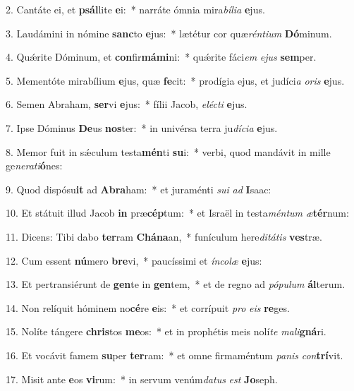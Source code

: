 2. Cantáte ei, et \textbf{psál}lite \textbf{e}i:~*  narráte ómnia mira\textit{bí}\textit{li}\textit{a} \textbf{e}jus.\

3. Laudámini in nómine \textbf{sanc}to \textbf{e}jus:~*  lætétur cor quæ\textit{rén}\textit{ti}\textit{um} \textbf{Dó}minum.\

4. Quǽrite Dóminum, et \textbf{con}fir\textbf{má}\textbf{mi}ni:~*  quǽrite fáci\textit{em} \textit{e}\textit{jus} \textbf{sem}per.\

5. Mementóte mirabílium \textbf{e}jus, quæ \textbf{fe}cit:~*  prodígia ejus, et judíci\textit{a} \textit{o}\textit{ris} \textbf{e}jus.\

6. Semen Abraham, \textbf{ser}vi \textbf{e}jus:~*  fílii Jacob, \textit{e}\textit{léc}\textit{ti} \textbf{e}jus.\

7. Ipse Dóminus \textbf{De}us \textbf{nos}ter:~*  in univérsa terra ju\textit{dí}\textit{ci}\textit{a} \textbf{e}jus.\

8. Memor fuit in sǽculum testa\textbf{mén}ti \textbf{su}i:~*  verbi, quod mandávit in mille ge\textit{ne}\textit{ra}\textit{ti}\textbf{ó}nes:\

9. Quod dispósu\textbf{it} ad \textbf{A}\textbf{bra}ham:~*  et juraménti \textit{su}\textit{i} \textit{ad} \textbf{I}saac:\

10. Et státuit illud Jacob \textbf{in} præ\textbf{cép}tum:~*  et Israël in testa\textit{mén}\textit{tum} \textit{æ}\textbf{tér}num:\

11. Dicens: Tibi dabo \textbf{ter}ram \textbf{Chá}\textbf{na}an,~*  funículum here\textit{di}\textit{tá}\textit{tis} \textbf{ves}træ.\

12. Cum essent \textbf{nú}mero \textbf{bre}vi,~*  paucíssimi et \textit{ín}\textit{co}\textit{læ} \textbf{e}jus:\

13. Et pertransiérunt de \textbf{gen}te in \textbf{gen}tem,~*  et de regno ad \textit{pó}\textit{pu}\textit{lum} \textbf{ál}terum.\

14. Non relíquit hóminem no\textbf{cé}re \textbf{e}is:~*  et corrípuit \textit{pro} \textit{e}\textit{is} \textbf{re}ges.\

15. Nolíte tángere \textbf{chris}tos \textbf{me}os:~*  et in prophétis meis nolí\textit{te} \textit{ma}\textit{li}\textbf{gná}ri.\

16. Et vocávit famem \textbf{su}per \textbf{ter}ram:~*  et omne firmaméntum \textit{pa}\textit{nis} \textit{con}\textbf{trí}vit.\

17. Misit ante \textbf{e}os \textbf{vi}rum:~*  in servum venúm\textit{da}\textit{tus} \textit{est} \textbf{Jo}seph.\

